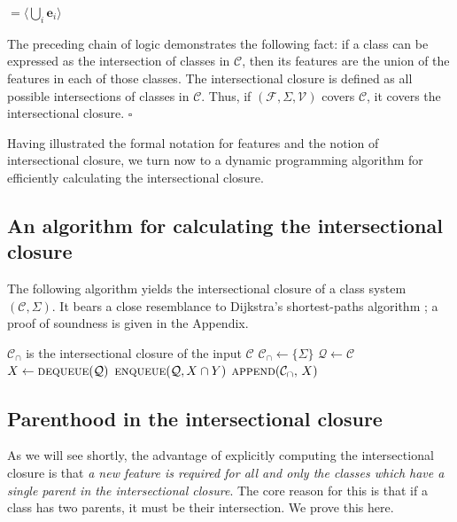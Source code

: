 \documentclass[11pt, oneside]{article}   	%
\begin{document}
\quad $= \langle \bigcup_i  \mathbf{e}_i \rangle$

\vspace{\baselineskip} \noindent The preceding chain of logic demonstrates the following fact: if a class can be expressed as the intersection of classes in $\mathcal C$, then its features are the union of the features in each of those classes. The intersectional closure is defined as all possible intersections of classes in $\mathcal C$. Thus, if $(\mathcal F, \Sigma, \mathcal V)$ covers $\mathcal C$, it covers the intersectional closure. $\square$

Having illustrated the formal notation for features and the notion of intersectional closure, we turn now to a dynamic programming algorithm for efficiently calculating the intersectional closure.

\subsection{An algorithm for calculating the intersectional closure}

The following algorithm yields the intersectional closure of a class system $(\mathcal C, \Sigma)$. It bears a close resemblance to Dijkstra's shortest-paths algorithm \cite{Dijkstra1959}; a proof of soundness is given in the Appendix.

\noindent \begin{algorithmic}
    \ENSURE $\mathcal C_\cap$ is the intersectional closure of the input $\mathcal C$
    \STATE
    \STATE $\mathcal C_\cap \leftarrow \{ \Sigma \} $
    \STATE $\mathcal Q \leftarrow \mathcal C$
    \STATE
        \STATE $X \leftarrow \textsc{dequeue}(\mathcal Q)$
                \STATE $\textsc{enqueue}(\mathcal Q, X \cap Y)$
            \ENDFOR
            \STATE $\textsc{append}(\mathcal C_\cap, \, X)$
        \ENDIF
    \ENDWHILE
\end{algorithmic}


\subsection{Parenthood in the intersectional closure}

As we will see shortly, the advantage of explicitly computing the intersectional closure is that \textit{a new feature is required for all and only the classes which have a single parent in the intersectional closure}. The core reason for this is that if a class has two parents, it must be their intersection. We prove this here.
\end{document}
